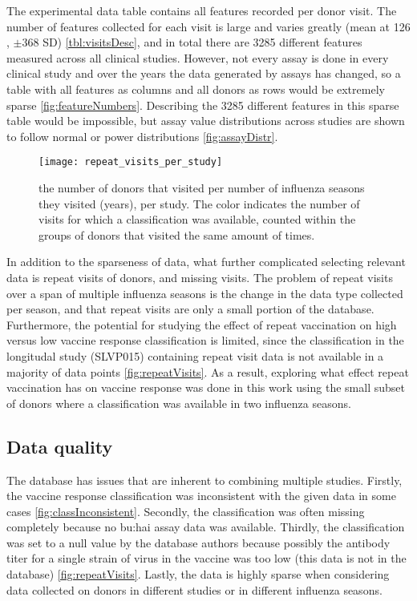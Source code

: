 The experimental data table contains all features recorded per donor visit.
The number of features collected for each visit is large and varies greatly (mean at 126 , \(\pm \)368 SD) \autoref{tbl:visitsDesc}, and in total there are 3285 different features measured across all clinical studies.
However, not every assay is done in every clinical study  and over the years the data generated by assays has changed, so a table with all features as columns and all donors as rows would be extremely sparse \autoref{fig:featureNumbers}.
Describing the 3285 different features in this sparse table would be impossible, but assay value distributions across studies are shown to follow normal or power distributions \autoref{fig:assayDistr}.

\begin{figure}[htpb]
    \texttt{[image: repeat\_visits\_per\_study]}
    \caption{the number of donors that visited per number of influenza seasons
    they visited (years), per study. The color indicates the number of visits for which a
    classification was available, counted within the groups of donors that
    visited the same amount of times.}\label{fig:repeatVisits}
\end{figure}

In addition to the sparseness of data, what further complicated selecting relevant data is repeat visits of donors, and missing visits.
The problem of repeat visits over a span of multiple influenza seasons is the change in the data type collected per season, and that repeat visits are only a small portion of the database.
Furthermore, the potential for studying the effect of repeat vaccination on high versus low vaccine response classification is limited, since the classification in the longitudal study (SLVP015) containing repeat visit data is not available in a majority of data points \autoref{fig:repeatVisits}.
As a result, exploring what effect repeat vaccination has on vaccine response was done in this work using the small subset of donors where a classification was available in two influenza seasons.

\subsection{Data quality}

The database has issues that are inherent to combining multiple studies.
Firstly, the vaccine response classification was inconsistent with the given data in some cases \autoref{fig:classInconsistent}.
Secondly, the classification was often missing completely because no \gls{bu:hai} assay data was available.
Thirdly, the classification was set to a null value by the database authors because possibly the antibody titer for a single strain of virus in the vaccine was too low (this data is not in the database) \autoref{fig:repeatVisits}.
Lastly, the data is highly sparse when considering data collected on donors in different studies or in different influenza seasons.

